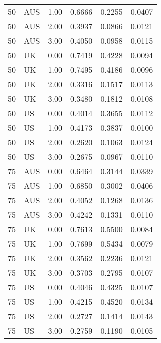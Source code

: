 \begin{table}[ht]
\begin{tabular}{llrlll}
  50 & AUS & 1.00 & 0.6666 & 0.2255 & 0.0407 \\ 
  50 & AUS & 2.00 & 0.3937 & 0.0866 & 0.0121 \\ 
  50 & AUS & 3.00 & 0.4050 & 0.0958 & 0.0115 \\ 
  50 & UK & 0.00 & 0.7419 & 0.4228 & 0.0094 \\ 
  50 & UK & 1.00 & 0.7495 & 0.4186 & 0.0096 \\ 
  50 & UK & 2.00 & 0.3316 & 0.1517 & 0.0113 \\ 
  50 & UK & 3.00 & 0.3480 & 0.1812 & 0.0108 \\ 
  50 & US & 0.00 & 0.4014 & 0.3655 & 0.0112 \\ 
  50 & US & 1.00 & 0.4173 & 0.3837 & 0.0100 \\ 
  50 & US & 2.00 & 0.2620 & 0.1063 & 0.0124 \\ 
  50 & US & 3.00 & 0.2675 & 0.0967 & 0.0110 \\ 
  75 & AUS & 0.00 & 0.6464 & 0.3144 & 0.0339 \\ 
  75 & AUS & 1.00 & 0.6850 & 0.3002 & 0.0406 \\ 
  75 & AUS & 2.00 & 0.4052 & 0.1268 & 0.0136 \\ 
  75 & AUS & 3.00 & 0.4242 & 0.1331 & 0.0110 \\ 
  75 & UK & 0.00 & 0.7613 & 0.5500 & 0.0084 \\ 
  75 & UK & 1.00 & 0.7699 & 0.5434 & 0.0079 \\ 
  75 & UK & 2.00 & 0.3562 & 0.2236 & 0.0121 \\ 
  75 & UK & 3.00 & 0.3703 & 0.2795 & 0.0107 \\ 
  75 & US & 0.00 & 0.4046 & 0.4325 & 0.0107 \\ 
  75 & US & 1.00 & 0.4215 & 0.4520 & 0.0134 \\ 
  75 & US & 2.00 & 0.2727 & 0.1414 & 0.0143 \\ 
  75 & US & 3.00 & 0.2759 & 0.1190 & 0.0105 \\ 
   \hline
\end{tabular}
\end{table}
